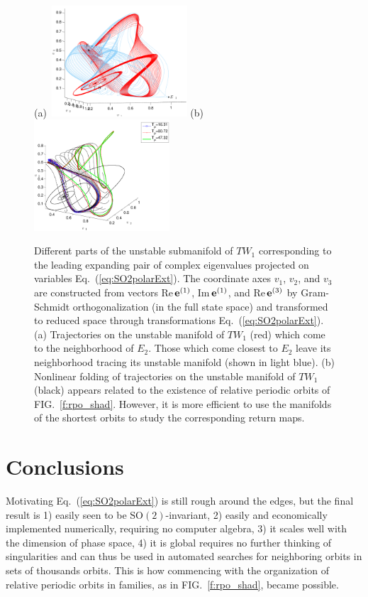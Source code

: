 \documentclass[aip,cha,showpacs,reprint]{revtex4-1} %
\newcommand{\refeq}  [1] {Eq.~(\ref{#1})}                   %
\newcommand{\reffig} [1] {FIG.~\ref{#1}}                    %
\newcommand{\On}[1]{\ensuremath{\textrm{O}(#1)}}
\newcommand{\SOn}[1]{\ensuremath{\textrm{SO}(#1)}}         %
\newcommand{\jEigvec}[1][]{\ensuremath{{\bf e}^{(#1)}}} %
\newcommand{\rpo}{rela\-ti\-ve periodic orbit}
\newcommand{\EQV}[1]{\ensuremath{E_{#1}}}
\newcommand{\REQV}[2]{\ensuremath{TW_{#1#2}}} %
\begin{document}
\begin{figure}[ht]
 \begin{center}
  (a)~\includegraphics[width=0.45\textwidth]{ks22_TW1_E2_manif_inv}
  (b)~\includegraphics[width=0.45\textwidth]{ks22_TW1_manif_rpos_inv}
 \end{center}
\caption{\label{f:ks22_TW1_manifold}
Different parts of the unstable submanifold of \REQV{}{1}
corresponding to the leading expanding pair of complex eigenvalues
projected on variables \refeq{eq:SO2polarExt}. The coordinate axes $v_1$,
$v_2$, and $v_3$ are constructed from vectors Re\,$\jEigvec[1]$,
Im\,$\jEigvec[1]$, and Re\,$\jEigvec[3]$ by Gram-Schmidt orthogonalization
(in the full state space) and transformed to reduced space through
transformations \refeq{eq:SO2polarExt}. (a) Trajectories on the unstable
manifold of \REQV{}{1} (red) which come to the neighborhood of $\EQV{2}$.
Those which come closest to $\EQV{2}$ leave its neighborhood tracing its
unstable manifold (shown in light blue). (b) Nonlinear folding of
trajectories on the unstable manifold of \REQV{}{1} (black) appears
related to the existence of \rpo s of \reffig{f:rpo_shad}. However, it is
more efficient to use the manifolds of the shortest orbits to study the
corresponding return maps.
  }
\end{figure}


\section{Conclusions}

Motivating \refeq{eq:SO2polarExt}
is still rough around the edges, but the final result is
1) easily seen to be $\SOn{2}$-invariant,
2) easily and economically
implemented numerically, requiring no computer algebra, 3) it scales well
with the dimension of phase space, 4) it is global requires no further
thinking of singularities and can thus be used in automated searches for
neighboring orbits in sets of thousands orbits. This is how commencing with the
organization of relative periodic orbits in families, as in \reffig{f:rpo_shad},
became possible.
\end{document}
